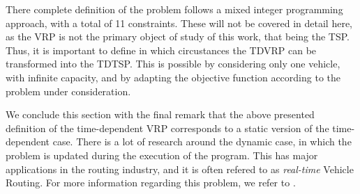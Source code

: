 There complete definition of the problem follows a mixed integer programming approach,
with a total of 11 constraints. These will not be covered in detail here, as the VRP is not 
the primary object of study of this work, that being the TSP. Thus,
it is important to define in which circustances the TDVRP can be transformed into the TDTSP.
This is possible by considering only one vehicle, with infinite capacity,
and by adapting the objective function according to the problem under consideration.

We conclude this section with the final remark that the above presented definition of the 
time-dependent VRP corresponds to a static version of the time-dependent case.
There is a lot of research around the dynamic case, in which the problem is updated
during the execution of the program. This has major applications in the routing industry,
and it is often refered to as \textit{real-time} Vehicle Routing. 
For more information regarding this problem, we refer to \cite{real_time_vrp} \cite{dynamic_vrp}.



